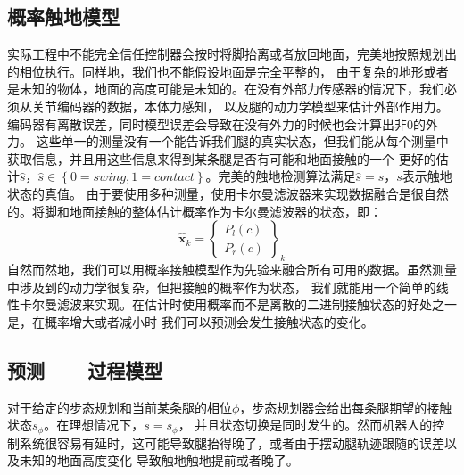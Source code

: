 \subsection{概率触地模型}
实际工程中不能完全信任控制器会按时将脚抬离或者放回地面，完美地按照规划出的相位执行。同样地，我们也不能假设地面是完全平整的，
由于复杂的地形或者是未知的物体，地面的高度可能是未知的。在没有外部力传感器的情况下，我们必须从关节编码器的数据，本体力感知，
以及腿的动力学模型来估计外部作用力。编码器有离散误差，同时模型误差会导致在没有外力的时候也会计算出非0的外力。
这些单一的测量没有一个能告诉我们腿的真实状态，但我们能从每个测量中获取信息，并且用这些信息来得到某条腿是否有可能和地面接触的一个
更好的估计$\hat s$，$\hat s \in \left\{0=swing, 1=contact\right\}$。完美的触地检测算法满足$\hat s = s$，$s$表示触地状态的真值。
由于要使用多种测量，使用卡尔曼滤波器来实现数据融合是很自然的。将脚和地面接触的整体估计概率作为卡尔曼滤波器的状态，即：
\begin{equation}
    \label{equ:est_state}
    \hat{\boldsymbol{x}}_k=\left\{\begin{array}{c}
        P_l(c) \\
        P_r(c)
        \end{array}\right\}_k
\end{equation}
自然而然地，我们可以用概率接触模型作为先验来融合所有可用的数据。虽然测量中涉及到的动力学很复杂，但把接触的概率作为状态，
我们就能用一个简单的线性卡尔曼滤波来实现。在估计时使用概率而不是离散的二进制接触状态的好处之一是，在概率增大或者减小时
我们可以预测会发生接触状态的变化。
\subsection{预测——过程模型}

对于给定的步态规划和当前某条腿的相位$\phi$，步态规划器会给出每条腿期望的接触状态$s_{\phi}$。在理想情况下，$s = s_{\phi}$，
并且状态切换是同时发生的。然而机器人的控制系统很容易有延时，这可能导致腿抬得晚了，或者由于摆动腿轨迹跟随的误差以及未知的地面高度变化
导致触地触地提前或者晚了。

